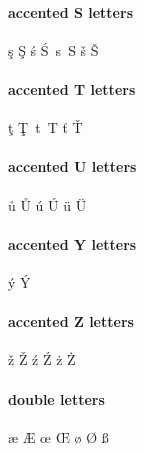 \documentclass[14pt]{article}%
\begin{document}
\paragraph{accented S letters}
\c{s}
\c{S}
\'{s}
\'{S}
\,{s}
\,{S}
\v{s}
\v{S}

\paragraph{accented T letters}
\c{t}
\c{T}
\,{t}
\,{T}
\v{t}
\v{T}

\paragraph{accented U letters}
\r{u}
\r{U}
\'{u}
\'{U}
\"{u}
\"{U}

\paragraph{accented Y letters}
\'{y}
\'{Y}

\paragraph{accented Z letters}
\v{z}
\v{Z}
\'{z}
\'{Z}
\.{z}
\.{Z}

\paragraph{double letters}
\ae
\AE
\dh
\DH
\dj
\ng
\NG
\oe
\OE
\o
\O
\ss
\SS
\end{document}

